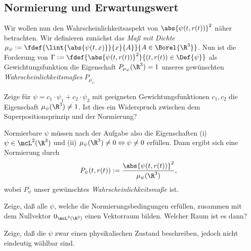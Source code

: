 \documentclass{subfiles}
\begin{document}
    \subsection{Normierung und Erwartungswert}
        Wir wollen nun den Wahrscheinlichkeitsaspekt von $\abs{\psi(t,r(t))}^2$ näher betrachten. Wir definieren zunächst das \emph{Maß mit Dichte} $\mu_\psi:=\fdef{\lint{\abs{\psi(t,x)}}{x}{A}}{A\in\Borel{\R^3}}$. Nun ist die Forderung von $\Gamma:=\fdef{\abs{\psi(t,r(t))}^2}{(t,r(t))\in\Def{\psi}}$ als Gewichtungsfunktion die Eigenschaft $P_{\mu_\psi}(\R^3) = 1$ unseres gewünschten \emph{Wahrscheinlichkeitsmaßes} $P_{\mu_\psi}$ 
        \begin{Aufgabe}
            \nr{} Zeige für $\psi = c_1\cdot\psi_1 + c_2\cdot\psi_2$ mit geeigneten Gewichtungsfunktionen $c_1,c_2$ die Eigenschaft $\mu_\psi(\R^3)\neq 1$. Ist dies ein Widerspruch zwischen dem Superpositionsprinzip und der Normierung?
        \end{Aufgabe}
        Normierbare $\psi$ müssen nach der Aufgabe also die Eigenschaften (i) $\psi\in\mcL^2(\R^3)$ und (ii) $\mu_\psi(\R^3)\neq 0\Leftrightarrow \psi\neq 0$ erfüllen. Dann ergibt sich eine Normierung durch
        \[P_\psi(t,r(t)):=\frac{\abs{\psi(t,r(t))}^2}{\mu_\psi(\R^3)},\]
        wobei $P_{\psi}$ unser gewünschtes \emph{Wahrscheinlichkeitsmaße} ist. 
        \begin{Aufgabe}
            \nr{} Zeige, daß alle $\psi$, welche die Normierungsbedingungen erfüllen, zusammen mit dem Nullvektor $0_{\mcL^2(\R^3)}$ einen Vektorraum bilden. Welcher Raum ist es dann?

            \nr{} Zeige, daß die $\psi$ zwar einen physikalischen Zustand beschreiben, jedoch nicht eindeutig wählbar sind. 
        \end{Aufgabe}
\end{document}
